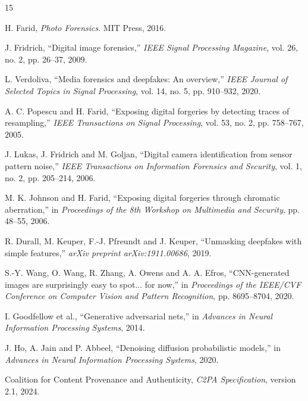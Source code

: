 \documentclass[14pt,a4paper,oneside]{report}
\begin{document}
\begin{thebibliography}{15}

 H. Farid, \textit{Photo Forensics}. MIT Press, 2016.

 J. Fridrich, ``Digital image forensics,'' \textit{IEEE Signal Processing Magazine}, vol. 26, no. 2, pp. 26--37, 2009.

 L. Verdoliva, ``Media forensics and deepfakes: An overview,'' \textit{IEEE Journal of Selected Topics in Signal Processing}, vol. 14, no. 5, pp. 910--932, 2020.

 A. C. Popescu and H. Farid, ``Exposing digital forgeries by detecting traces of resampling,'' \textit{IEEE Transactions on Signal Processing}, vol. 53, no. 2, pp. 758--767, 2005.

 J. Lukas, J. Fridrich and M. Goljan, ``Digital camera identification from sensor pattern noise,'' \textit{IEEE Transactions on Information Forensics and Security}, vol. 1, no. 2, pp. 205--214, 2006.

 M. K. Johnson and H. Farid, ``Exposing digital forgeries through chromatic aberration,'' in \textit{Proceedings of the 8th Workshop on Multimedia and Security}, pp. 48--55, 2006.

 R. Durall, M. Keuper, F.-J. Pfreundt and J. Keuper, ``Unmasking deepfakes with simple features,'' \textit{arXiv preprint arXiv:1911.00686}, 2019.

 S.-Y. Wang, O. Wang, R. Zhang, A. Owens and A. A. Efros, ``CNN-generated images are surprisingly easy to spot... for now,'' in \textit{Proceedings of the IEEE/CVF Conference on Computer Vision and Pattern Recognition}, pp. 8695--8704, 2020.

 I. Goodfellow et al., ``Generative adversarial nets,'' in \textit{Advances in Neural Information Processing Systems}, 2014.

 J. Ho, A. Jain and P. Abbeel, ``Denoising diffusion probabilistic models,'' in \textit{Advances in Neural Information Processing Systems}, 2020.

 Coalition for Content Provenance and Authenticity, \textit{C2PA Specification}, version 2.1, 2024.

\end{thebibliography}
\end{document}
